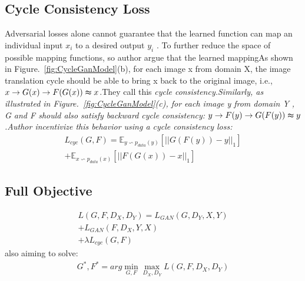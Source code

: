 \documentclass[10pt,twocolumn,letterpaper]{article}
\begin{document}
\subsection{Cycle Consistency Loss}
Adversarial losses alone cannot guarantee that the learned function can map an individual input $x_{i}$ to a desired output $y_{i}$ . To further reduce the space of possible mapping functions, so author argue that the learned mappingAs shown in Figure.~\ref{fig:CycleGanModel}(b), for each image x from domain X, the image translation cycle should be able to bring x back to the original image,
i.e., $x\to G(x) \to F (G(x)) \thickapprox x$.They call this \itshape cycle consistency\upshape .Similarly, as illustrated in Figure.~\ref{fig:CycleGanModel}(c), for each image y from domain Y , G and F should also satisfy
backward cycle consistency: $y \to F (y) \to G(F (y)) \thickapprox y$.Author incentivize this behavior using a cycle consistency loss:
\begin{equation}
\begin{aligned}
L_{cyc}(G,F)=\mathbb{E}_{y \backsim p_{data}(y)} \left[||G(F(y))-y||_{1}\right]\\
+\mathbb{E}_{x \backsim p_{data}(x)} \left[||F(G(x))-x||_{1}\right]
\end{aligned}
\end{equation}
\subsection{Full Objective}
\begin{equation}
\begin{aligned}
L(G,F,D_{X},D_{Y}) = L_{GAN}(G,D_{Y},X,Y)\\+L_{GAN}(F,D_{X},Y,X)\\+\lambda L_{cyc}(G,F)
\end{aligned}
\end{equation}
also aiming to solve:
\begin{equation}
\begin{aligned}
G^{*},F^{*} = arg \min_{G,F}\max_{D_{X},D_{Y}}L(G,F,D_{X},D_{Y})
\end{aligned}
\end{equation}
{\small


}
\end{document}

